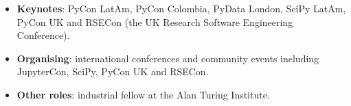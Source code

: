 
\begin{cvparagraph}
\begin{itemize}[leftmargin=2ex, nosep, noitemsep, label=\textbullet]
  \item \textbf{Keynotes}: PyCon LatAm, PyCon Colombia, PyData London, SciPy LatAm, PyCon UK and RSECon (the UK Research Software Engineering Conference).
  \item \textbf{Organising}: international conferences and community events including JupyterCon, SciPy, PyCon UK and RSECon.
  \item \textbf{Other roles}: industrial fellow at the Alan Turing Institute.
\end{itemize}
\end{cvparagraph}
